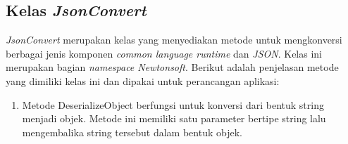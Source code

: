 \subsection{Kelas \textit{JsonConvert}}
\label{lab:Kelas JsonConvert}
\hspace{0.5cm} \textit{JsonConvert} merupakan kelas yang menyediakan metode untuk mengkonversi berbagai jenis komponen \textit{common language runtime} dan \textit{JSON}. Kelas ini merupakan bagian \textit{namespace Newtonsoft}.  Berikut adalah penjelasan metode yang dimiliki kelas ini dan dipakai untuk perancangan aplikasi:
\begin{enumerate}
	\item Metode DeserializeObject berfungsi untuk konversi dari bentuk string menjadi objek. Metode ini memiliki satu parameter bertipe string lalu mengembalika string tersebut dalam bentuk objek.
\end{enumerate}


